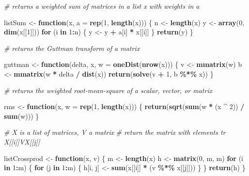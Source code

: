 \documentclass[
  12pt,
]{article}
\newenvironment{Shaded}{\begin{snugshade}}{\end{snugshade}}
\newcommand{\AttributeTok}[1]{\textcolor[rgb]{0.13,0.29,0.53}{#1}}
\newcommand{\CommentTok}[1]{\textcolor[rgb]{0.56,0.35,0.01}{\textit{#1}}}
\newcommand{\ControlFlowTok}[1]{\textcolor[rgb]{0.13,0.29,0.53}{\textbf{#1}}}
\newcommand{\DecValTok}[1]{\textcolor[rgb]{0.00,0.00,0.81}{#1}}
\newcommand{\FunctionTok}[1]{\textcolor[rgb]{0.13,0.29,0.53}{\textbf{#1}}}
\newcommand{\NormalTok}[1]{#1}
\newcommand{\OtherTok}[1]{\textcolor[rgb]{0.56,0.35,0.01}{#1}}
\newcommand{\SpecialCharTok}[1]{\textcolor[rgb]{0.81,0.36,0.00}{\textbf{#1}}}
\begin{document}
\begin{Shaded}
\begin{Highlighting}[]
\CommentTok{\# returns a weighted sum of matrices in a list x with weights in a}

\NormalTok{listSum }\OtherTok{\textless{}{-}} \ControlFlowTok{function}\NormalTok{(x, }\AttributeTok{a =} \FunctionTok{rep}\NormalTok{(}\DecValTok{1}\NormalTok{, }\FunctionTok{length}\NormalTok{(x))) \{}
\NormalTok{  n }\OtherTok{\textless{}{-}} \FunctionTok{length}\NormalTok{(x)}
\NormalTok{  y }\OtherTok{\textless{}{-}} \FunctionTok{array}\NormalTok{(}\DecValTok{0}\NormalTok{, }\FunctionTok{dim}\NormalTok{(x[[}\DecValTok{1}\NormalTok{]]))}
  \ControlFlowTok{for}\NormalTok{ (i }\ControlFlowTok{in} \DecValTok{1}\SpecialCharTok{:}\NormalTok{n) \{}
\NormalTok{    y }\OtherTok{\textless{}{-}}\NormalTok{ y }\SpecialCharTok{+}\NormalTok{ a[i] }\SpecialCharTok{*}\NormalTok{ x[[i]]}
\NormalTok{  \}}
  \FunctionTok{return}\NormalTok{(y)}
\NormalTok{\}}

\CommentTok{\# returns the Guttman transform of a matrix}

\NormalTok{guttman }\OtherTok{\textless{}{-}} \ControlFlowTok{function}\NormalTok{(delta, x, }\AttributeTok{w =} \FunctionTok{oneDist}\NormalTok{(}\FunctionTok{nrow}\NormalTok{(x))) \{}
\NormalTok{  v }\OtherTok{\textless{}{-}} \FunctionTok{mmatrix}\NormalTok{(w)}
\NormalTok{  b }\OtherTok{\textless{}{-}} \FunctionTok{mmatrix}\NormalTok{(w }\SpecialCharTok{*}\NormalTok{ delta }\SpecialCharTok{/} \FunctionTok{dist}\NormalTok{(x))}
  \FunctionTok{return}\NormalTok{(}\FunctionTok{solve}\NormalTok{(v }\SpecialCharTok{+} \DecValTok{1}\NormalTok{, b }\SpecialCharTok{\%*\%}\NormalTok{ x))}
\NormalTok{\}}

\CommentTok{\# returns the weighted root{-}mean{-}square of a scalar, vector, or matrix}

\NormalTok{rms }\OtherTok{\textless{}{-}} \ControlFlowTok{function}\NormalTok{(x, }\AttributeTok{w =} \FunctionTok{rep}\NormalTok{(}\DecValTok{1}\NormalTok{, }\FunctionTok{length}\NormalTok{(x))) \{}
  \FunctionTok{return}\NormalTok{(}\FunctionTok{sqrt}\NormalTok{(}\FunctionTok{sum}\NormalTok{(w }\SpecialCharTok{*}\NormalTok{ (x }\SpecialCharTok{\^{}} \DecValTok{2}\NormalTok{)) }\SpecialCharTok{/} \FunctionTok{sum}\NormalTok{(w)))}
\NormalTok{\}}

\CommentTok{\# X is a list of matrices, V a matrix}
\CommentTok{\# return the matrix with elements tr X[[i]]\textquotesingle{}VX[[j]]}

\NormalTok{listCrossprod }\OtherTok{\textless{}{-}} \ControlFlowTok{function}\NormalTok{(x, v) \{}
\NormalTok{  m }\OtherTok{\textless{}{-}} \FunctionTok{length}\NormalTok{(x)}
\NormalTok{  h }\OtherTok{\textless{}{-}} \FunctionTok{matrix}\NormalTok{(}\DecValTok{0}\NormalTok{, m, m)}
  \ControlFlowTok{for}\NormalTok{ (i }\ControlFlowTok{in} \DecValTok{1}\SpecialCharTok{:}\NormalTok{m) \{}
    \ControlFlowTok{for}\NormalTok{ (j }\ControlFlowTok{in} \DecValTok{1}\SpecialCharTok{:}\NormalTok{m) \{}
\NormalTok{      h[i, j] }\OtherTok{\textless{}{-}} \FunctionTok{sum}\NormalTok{(x[[i]] }\SpecialCharTok{*}\NormalTok{ (v }\SpecialCharTok{\%*\%}\NormalTok{ x[[j]]))}
\NormalTok{    \}}
\NormalTok{  \}}
  \FunctionTok{return}\NormalTok{(h)}
\NormalTok{\}}


\end{Highlighting}
\end{Shaded}
\end{document}
